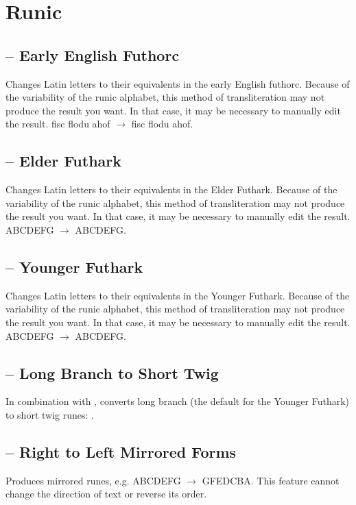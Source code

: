 \section{Runic}
\subsection{ – Early English Futhorc}
Changes Latin letters to their equivalents in the early English futhorc. Because of the variability of the runic
alphabet, this method of transliteration may not produce the result you want. In that case, it may be necessary to
manually edit the result. fisc flodu ahof $\rightarrow $ {fisc flodu ahof}.

\subsection{ – Elder
Futhark}
Changes Latin letters to their equivalents in the Elder Futhark. Because of the variability of the runic alphabet, this
method of transliteration may not produce the result you want. In that case, it may be necessary to manually edit the
result. ABCDEFG $\rightarrow $ {ABCDEFG}.

\subsection{ – Younger
Futhark}
Changes Latin letters to their equivalents in the Younger Futhark. Because of the variability of the runic alphabet,
this method of transliteration may not produce the result you want. In that case, it may be necessary to manually edit
the result. ABCDEFG $\rightarrow $ {ABCDEFG}.

\subsection{ –
Long Branch to Short Twig}
In combination with , converts long branch (the default for the Younger Futhark) to short twig runes:
{}.

\subsection{
– Right to Left Mirrored Forms}
Produces mirrored runes, e.g. {ABCDEFG $\rightarrow $ GFEDCBA}.
This feature cannot change the direction of text or reverse its order.

